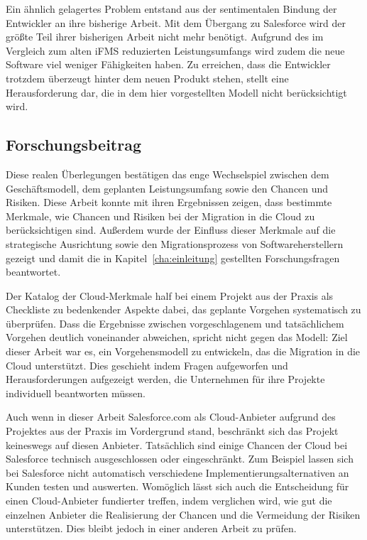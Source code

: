Ein ähnlich gelagertes Problem entstand aus der sentimentalen Bindung der 
Entwickler an ihre bisherige Arbeit. Mit dem Übergang zu Salesforce wird der 
größte Teil ihrer bisherigen Arbeit nicht mehr benötigt. Aufgrund des im 
Vergleich zum alten iFMS reduzierten Leistungsumfangs wird zudem die neue 
Software viel weniger Fähigkeiten haben. Zu erreichen, dass die 
Entwickler trotzdem überzeugt hinter dem neuen Produkt stehen, stellt eine 
Herausforderung dar, die in dem hier vorgestellten Modell nicht berücksichtigt 
wird.

\subsection{Forschungsbeitrag}
Diese realen Überlegungen bestätigen das enge Wechselspiel zwischen dem 
Geschäftsmodell, dem geplanten Leistungsumfang sowie den Chancen und Risiken.
Diese Arbeit konnte mit ihren Ergebnissen zeigen, dass bestimmte Merkmale, wie 
Chancen und Risiken bei der Migration in die Cloud zu berücksichtigen sind. 
Außerdem wurde der Einfluss dieser Merkmale auf die strategische Ausrichtung sowie den Migrationsprozess von Softwareherstellern gezeigt und damit die in Kapitel~\ref{cha:einleitung} gestellten Forschungsfragen 
beantwortet.

Der Katalog der Cloud-Merkmale half bei einem Projekt aus der Praxis als 
Checkliste zu bedenkender Aspekte dabei, das geplante Vorgehen systematisch zu 
überprüfen. Dass die Ergebnisse zwischen vorgeschlagenem und tatsächlichem 
Vorgehen deutlich voneinander abweichen, spricht nicht gegen das Modell: Ziel 
dieser Arbeit war 
es, ein Vorgehensmodell zu entwickeln, das die Migration in die Cloud 
unterstützt. Dies geschieht indem Fragen aufgeworfen und Herausforderungen 
aufgezeigt werden, die Unternehmen für ihre Projekte individuell beantworten 
müssen. 

Auch wenn in dieser Arbeit Salesforce.com als Cloud-Anbieter aufgrund des 
Projektes aus der Praxis im Vordergrund stand, beschränkt sich das Projekt 
keineswegs auf diesen Anbieter. Tatsächlich sind einige Chancen der Cloud bei 
Salesforce technisch ausgeschlossen oder eingeschränkt. Zum Beispiel lassen 
sich bei Salesforce nicht automatisch verschiedene Implementierungsalternativen 
an Kunden testen und auswerten. 
Womöglich lässt sich auch die Entscheidung für 
einen Cloud-Anbieter fundierter treffen, indem verglichen wird, wie gut die 
einzelnen Anbieter die Realisierung der Chancen und die Vermeidung der Risiken 
unterstützen. Dies bleibt jedoch in einer anderen Arbeit zu prüfen.

